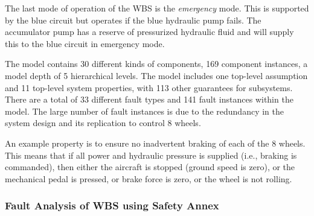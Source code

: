 The last mode of operation of the WBS is the \textit{emergency} mode. This is supported by the blue circuit but operates if the blue hydraulic pump fails. The accumulator pump has a reserve of pressurized hydraulic fluid and will supply this to the blue circuit in emergency mode.

The model contains 30 different kinds of components, 169 component instances, a model depth of 5 hierarchical levels.  The model includes one top-level assumption and  11 top-level system properties, with 113 other guarantees for subsystems.  There are a total of 33 different fault types and 141 fault instances within the model.  The large number of fault instances is due to the redundancy in the system design and its replication to control 8 wheels. %


An example property is to ensure no inadvertent braking of each of the 8 wheels.  This means that if all power and hydraulic pressure is supplied (i.e., braking is commanded), then either the aircraft is stopped (ground speed is zero), or the mechanical pedal is pressed, or brake force is zero, or the wheel is not rolling.


\subsubsection{Fault Analysis of WBS using Safety Annex}

\iffalse

